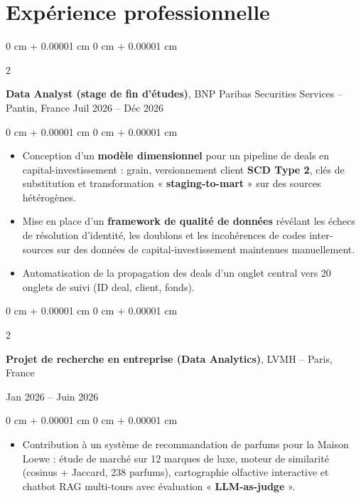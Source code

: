 \documentclass[10pt, letterpaper]{article}
\newenvironment{highlights}{
    \begin{itemize}[
        topsep=0.04 cm,
        parsep=0.02cm,
        partopsep=0pt,
        itemsep=0pt,
        leftmargin=0 cm + 10pt
    ]
}{
    \end{itemize}
} %
\newcommand{\stronglink}[2]{%
    \href{#1}{\textbf{\uline{\textcolor{blue}{#2}}}}%
}
\newenvironment{onecolentry}{
    \begin{adjustwidth}{
        0 cm + 0.00001 cm
    }{
        0 cm + 0.00001 cm
    }
}{
    \end{adjustwidth}
} %
\newenvironment{twocolentry}[2][]{
    \onecolentry
    \def\secondColumn{#2}
    \setcolumnwidth{\fill, 3.8 cm}
    \begin{paracol}{2}
}{
    \switchcolumn \raggedleft \secondColumn
    \end{paracol}
    \endonecolentry
} %
\begin{document}
    \section{Expérience professionnelle}
        \begin{twocolentry}{
            Juil 2026 – Déc 2026
        }
            \textbf{Data Analyst (stage de fin d'études)}, BNP Paribas Securities Services -- Pantin, France\end{twocolentry}

        \vspace{0.10 cm}
        \begin{onecolentry}
            \begin{highlights}
                \item Conception d'un \textbf{modèle dimensionnel} pour un pipeline de deals en capital-investissement : grain, versionnement client \textbf{SCD Type 2}, clés de substitution et transformation « \textbf{staging-to-mart} » sur des sources hétérogènes.
                \item Mise en place d'un \textbf{framework de qualité de données} révélant les échecs de résolution d'identité, les doublons et les incohérences de codes inter-sources sur des données de capital-investissement maintenues manuellement.
                \item Automatisation de la propagation des deals d'un onglet central vers 20 onglets de suivi (ID deal, client, fonds).
            \end{highlights}
        \end{onecolentry}

    \vspace{0.2 cm}

        \begin{twocolentry}{
            Jan 2026 – Juin 2026
        }
        \textbf{Projet de recherche en entreprise (Data Analytics)}, LVMH -- Paris, France \hfill
        \end{twocolentry}

        \vspace{0.10 cm}
        \begin{onecolentry}
        \begin{highlights}
            \item Contribution à un système de recommandation de parfums pour la Maison Loewe : étude de marché sur 12 marques de luxe, moteur de similarité (cosinus + Jaccard, 238 parfums), cartographie olfactive interactive et chatbot RAG multi-tours avec évaluation « \textbf{LLM-as-judge} ».
        \end{highlights}
        \end{onecolentry}
\end{document}

